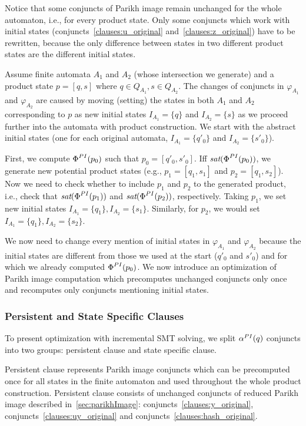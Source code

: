 Notice that some conjuncts of Parikh image remain unchanged for the whole automaton, i.e., for every product state. Only some conjuncts which work with initial states (conjuncts~\ref{clauses:u_original} and~\ref{clauses:z_original}) have to be rewritten, because the only difference between states in two different product states are the different initial states.

Assume finite automata $A_1$ and $A_2$ (whose intersection we generate) and a product state $p = [q, s]$ where $q \in Q_{A_1}, s \in Q_{A_2}$. The changes of conjuncts in $\varphi_{A_1}$ and $\varphi_{A_2}$ are caused by moving (setting) the states in both $A_1$ and $A_2$ corresponding to $p$ as new initial states $I_{A_1} = \{q\}$ and $I_{A_2} = \{s\}$ as we proceed further into the automata with product construction. We start with the abstract initial states (one for each original automata, $I_{A_1} = \{q'_0\}$ and $I_{A_2} = \{s'_0\}$).

First, we compute $\emph{$\Phi$}^{PI}(p_0)$ such that $p_0 = [q'_0,s'_0]$. Iff $\emph{sat}(\emph{$\Phi$}^{PI}(p_0))$, we generate new potential product states (e.g., $p_1 = [q_1, s_1]$ and $p_2 = [q_1, s_2]$). Now we need to check whether to include $p_1$ and $p_2$ to the generated product, i.e., check that $\emph{sat}(\emph{$\Phi$}^{PI}(p_1))$ and $\emph{sat}(\emph{$\Phi$}^{PI}(p_2))$, respectively. Taking $p_1$, we set new initial states $I_{A_1} = \{q_1\}, I_{A_2} = \{s_1\}$. Similarly, for $p_2$, we would set $I_{A_1} = \{q_1\}, I_{A_2} = \{s_2\}$.

We now need to change every mention of initial states in $\varphi_{A_1}$ and $\varphi_{A_2}$ because the initial states are different from those we used at the start ($q'_0$ and $s'_0$) and for which we already computed $\emph{$\Phi$}^{PI}(p_0)$. We now introduce an optimization of Parikh image computation which precomputes unchanged conjuncts only once and recomputes only conjuncts mentioning initial states.

\subsubsection{Persistent and State Specific Clauses}

To present optimization with incremental SMT solving, we split $\alpha^{PI}(q)$ conjuncts into two groups: persistent clause and state specific clause.

Persistent clause represents Parikh image conjuncts which can be precomputed once for all states in the finite automaton and used throughout the whole product construction. Persistent clause consists of unchanged conjuncts of reduced Parikh image described in~\ref{sec:parikhImage}: conjuncts~\ref{clauses:y_original}, conjuncts~\ref{clauses:uy_original} and conjuncts~\ref{clauses:hash_original}.

